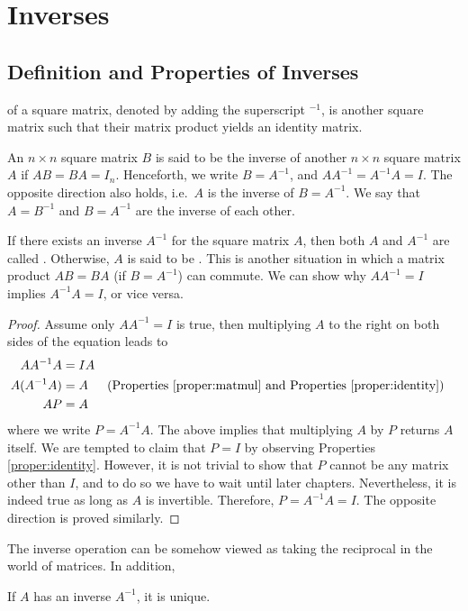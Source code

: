 \section{Inverses}
\label{section:inv}
\subsection{Definition and Properties of Inverses}
 of a square matrix, denoted by adding the superscript $^{-1}$, is another square matrix such that their matrix product yields an identity matrix.
\begin{defn}[Inverse]
\label{defn:inverse}
An $n \times n$ square matrix $B$ is said to be the inverse of another $n \times n$ square matrix $A$ if $AB = BA = I_n$. Henceforth, we write $B = A^{-1}$, and $AA^{-1} = A^{-1}A = I$. The opposite direction also holds, i.e.\ $A$ is the inverse of $B = A^{-1}$. We say that $A=B^{-1}$ and $B=A^{-1}$ are the inverse of each other.
\end{defn}
If there exists an inverse $A^{-1}$ for the square matrix $A$, then both $A$ and $A^{-1}$ are called . Otherwise, $A$ is said to be . This is another situation in which a matrix product $AB = BA$ (if $B=A^{-1}$) can commute. We can show why $AA^{-1} = I$ implies $A^{-1}A = I$, or vice versa.
\begin{proof}
Assume only $AA^{-1} = I$ is true, then multiplying $A$ to the right on both sides of the equation leads to
\begin{align*}
AA^{-1}A &= IA \\
A(A^{-1}A) &= A & & \text{(Properties \ref{proper:matmul} and Properties \ref{proper:identity})}\\
AP &= A
\end{align*}
where we write $P = A^{-1}A$. The above implies that multiplying $A$ by $P$ returns $A$ itself. We are tempted to claim that $P = I$ by observing Properties \ref{proper:identity}. However, it is not trivial to show that $P$ cannot be any matrix other than $I$, and to do so we have to wait until later chapters. Nevertheless, it is indeed true as long as $A$ is invertible. Therefore, $P = A^{-1}A = I$. The opposite direction is proved similarly.    
\end{proof}
The inverse operation can be somehow viewed as taking the reciprocal in the world of matrices. In addition,
\begin{proper}
\label{proper:uniqueinverse}
If $A$ has an inverse $A^{-1}$, it is unique.
\end{proper}
